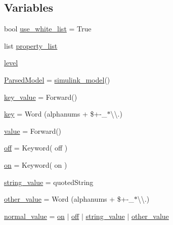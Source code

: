 \subsection*{Variables}
\begin{DoxyCompactItemize}
\item 
bool \hyperlink{namespacesylva_1_1frontend_1_1mdl__reader_a59bad144a21d04a6847a82ed9aeb9aad}{use\+\_\+white\+\_\+list} = True
\item 
list \hyperlink{namespacesylva_1_1frontend_1_1mdl__reader_adeb4e351f2cedb282678906b4f6a7178}{property\+\_\+list}
\item 
\hyperlink{namespacesylva_1_1frontend_1_1mdl__reader_aad201f37e53e165e9ea929020f01268b}{level}
\item 
\hyperlink{namespacesylva_1_1frontend_1_1mdl__reader_ad384a0048b62838cc068089a983d0742}{Parsed\+Model} = \hyperlink{classsylva_1_1frontend_1_1mdl__reader_1_1simulink__model}{simulink\+\_\+model}()
\item 
\hyperlink{namespacesylva_1_1frontend_1_1mdl__reader_ab486fd03c0920f56c3256072a68fa07e}{key\+\_\+value} = Forward()
\item 
\hyperlink{namespacesylva_1_1frontend_1_1mdl__reader_ac7180f117231855bb60b36d9602c72a1}{key} = Word (alphanums + \textquotesingle{}\$+-\/\+\_\+$\ast$\textbackslash{}\textbackslash{}.\textquotesingle{})
\item 
\hyperlink{namespacesylva_1_1frontend_1_1mdl__reader_a20dbd52811dc7d7916a801d1b8cc772e}{value} = Forward()
\item 
\hyperlink{namespacesylva_1_1frontend_1_1mdl__reader_a26a83a8cd91347ea93b5b678c14baf7a}{off} = Keyword( \textquotesingle{}off\textquotesingle{} )
\item 
\hyperlink{namespacesylva_1_1frontend_1_1mdl__reader_a8fb0a02ca237b01f23245c80760b4071}{on} = Keyword( \textquotesingle{}on\textquotesingle{} )
\item 
\hyperlink{namespacesylva_1_1frontend_1_1mdl__reader_ab10130f0d0adc28ded718ac26c1abc5c}{string\+\_\+value} = quoted\+String
\item 
\hyperlink{namespacesylva_1_1frontend_1_1mdl__reader_a14e5f5e94df43c0c60a7f83c1d5a574e}{other\+\_\+value} = Word (alphanums + \textquotesingle{}\$+-\/\+\_\+$\ast$\textbackslash{}\textbackslash{}.\textquotesingle{})
\item 
\hyperlink{namespacesylva_1_1frontend_1_1mdl__reader_a29a2a57aa15b95311fcc436d42ccc110}{normal\+\_\+value} = \hyperlink{namespacesylva_1_1frontend_1_1mdl__reader_a8fb0a02ca237b01f23245c80760b4071}{on} $\vert$ \hyperlink{namespacesylva_1_1frontend_1_1mdl__reader_a26a83a8cd91347ea93b5b678c14baf7a}{off} $\vert$ \hyperlink{namespacesylva_1_1frontend_1_1mdl__reader_ab10130f0d0adc28ded718ac26c1abc5c}{string\+\_\+value} $\vert$ \hyperlink{namespacesylva_1_1frontend_1_1mdl__reader_a14e5f5e94df43c0c60a7f83c1d5a574e}{other\+\_\+value}

\end{DoxyCompactItemize}
